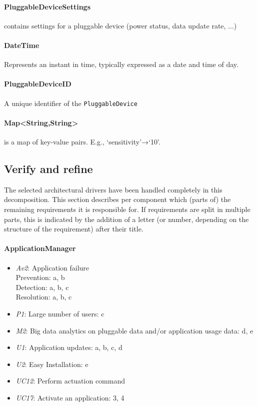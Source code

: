     \paragraph{PluggableDeviceSettings}
              contains settings for a pluggable device (power status,
              data update rate, ...)
    \paragraph{DateTime}
               Represents an instant in time, typically expressed as a date and time of day.
    \paragraph{PluggableDeviceID}
               A unique identifier of the \texttt{PluggableDevice}
    \paragraph{Map<String,String>}
               is a map of key-value pairs.  E.g., ‘sensitivity’→‘10’.


\subsection{Verify and refine}
    The selected architectural drivers have been handled completely
    in this decomposition.
    This section describes per component which (parts of) the remaining
    requirements it is responsible for. If requirements are split in
    multiple parts, this is indicated by the addition of a letter
    (or number, depending on the structure of the requirement) after their title.

    \paragraph{ApplicationManager}
        \begin{itemize}
            \item \emph{Av2}: Application failure \\
                   Prevention: a, b \\
                   Detection: a, b, c \\
                   Resolution: a, b, c
           \item \emph{P1}: Large number of users: c
           \item \emph{M2}: Big data analytics on pluggable data and/or application usage data: d, e
           \item \emph{U1}: Application updates: a, b, c, d
           \item \emph{U2}: Easy Installation: e
           \item \emph{UC12}: Perform actuation command
           \item \emph{UC17}: Activate an application: 3, 4
        \end{itemize}

